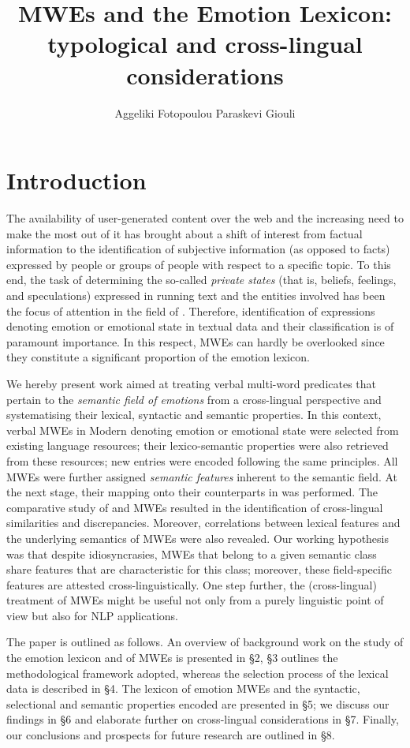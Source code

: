 \documentclass[output=paper]{langsci/langscibook}
\author{Aggeliki Fotopoulou\affiliation{Institute for Language and Speech Processing, Athena RIC, Greece}%
\lastand Paraskevi Giouli \affiliation{Institute for Language and Speech Processing, Athena RIC, Greece}}
\title{MWEs and the Emotion Lexicon: typological and cross-lingual considerations}\shorttitlerunninghead{MWEs and the Emotion Lexicon}
\begin{document}
\section{Introduction}


The availability of user-generated content over the web and the
increasing need to make the most out of it has brought about a shift of
interest from factual information to the identification of subjective
information (as opposed to facts) expressed by people or groups of
people with respect to a specific topic. To this end, the task of
determining the so-called \textit{private states} (that is,
beliefs, feelings, and speculations) expressed in running text and the
entities involved has been the focus of attention in the field of
. Therefore, identification of
expressions denoting emotion or emotional state in textual data and
their classification is of paramount importance. In this respect, MWEs
can hardly be overlooked since they constitute a significant proportion
of the emotion lexicon.

We hereby present work aimed at treating  verbal multi-word predicates
that pertain to the \textit{semantic field of emotions} from a
cross-lingual perspective and systematising their lexical, syntactic
and semantic properties. In this context, verbal MWEs in Modern  denoting emotion or emotional state were selected from existing
language resources; their lexico-semantic properties were also
retrieved from these resources; new entries were encoded following the
same principles. All MWEs were further assigned \textit{semantic
features }inherent to the semantic field. At the next stage, their
mapping onto their counterparts in  was performed. The
comparative study of  and  MWEs resulted in the identification of
cross-lingual similarities and discrepancies. Moreover, correlations
between lexical features and the underlying semantics of MWEs were also
revealed. Our working hypothesis was that despite idiosyncrasies, MWEs
that belong to a given semantic class share features that are
characteristic for this class; moreover, these field-specific features
are attested cross-linguistically. One step further, the
(cross-lingual) treatment of MWEs might be useful not only from a
purely linguistic point of view but also for NLP applications.


The paper is outlined as follows. An overview of background work on the
study of the emotion lexicon and of MWEs is presented in §2,
 §3 outlines the methodological framework adopted,
whereas the selection process of the lexical data is described in
§4. The lexicon of emotion MWEs and the syntactic, selectional
and semantic properties encoded are presented in §5; we discuss
our findings in §6 and elaborate further on cross-lingual
considerations in §7. Finally, our conclusions and prospects for
future research are outlined in §8.
\end{document}
